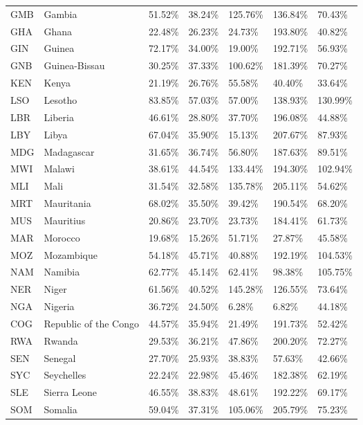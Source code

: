 \begin{table}[htbp]
\begin{tabular}{lllllll}
  GMB & Gambia & 51.52\% & 38.24\% & 125.76\% & 136.84\% & 70.43\% \\ 
  GHA & Ghana & 22.48\% & 26.23\% & 24.73\% & 193.80\% & 40.82\% \\ 
  GIN & Guinea & 72.17\% & 34.00\% & 19.00\% & 192.71\% & 56.93\% \\ 
  GNB & Guinea-Bissau & 30.25\% & 37.33\% & 100.62\% & 181.39\% & 70.27\% \\ 
  KEN & Kenya & 21.19\% & 26.76\% & 55.58\% & 40.40\% & 33.64\% \\ 
  LSO & Lesotho & 83.85\% & 57.03\% & 57.00\% & 138.93\% & 130.99\% \\ 
  LBR & Liberia & 46.61\% & 28.80\% & 37.70\% & 196.08\% & 44.88\% \\ 
  LBY & Libya & 67.04\% & 35.90\% & 15.13\% & 207.67\% & 87.93\% \\ 
  MDG & Madagascar & 31.65\% & 36.74\% & 56.80\% & 187.63\% & 89.51\% \\ 
  MWI & Malawi & 38.61\% & 44.54\% & 133.44\% & 194.30\% & 102.94\% \\ 
  MLI & Mali & 31.54\% & 32.58\% & 135.78\% & 205.11\% & 54.62\% \\ 
  MRT & Mauritania & 68.02\% & 35.50\% & 39.42\% & 190.54\% & 68.20\% \\ 
  MUS & Mauritius & 20.86\% & 23.70\% & 23.73\% & 184.41\% & 61.73\% \\ 
  MAR & Morocco & 19.68\% & 15.26\% & 51.71\% & 27.87\% & 45.58\% \\ 
  MOZ & Mozambique & 54.18\% & 45.71\% & 40.88\% & 192.19\% & 104.53\% \\ 
  NAM & Namibia & 62.77\% & 45.14\% & 62.41\% & 98.38\% & 105.75\% \\ 
  NER & Niger & 61.56\% & 40.52\% & 145.28\% & 126.55\% & 73.64\% \\ 
  NGA & Nigeria & 36.72\% & 24.50\% & 6.28\% & 6.82\% & 44.18\% \\ 
  COG & Republic of the Congo & 44.57\% & 35.94\% & 21.49\% & 191.73\% & 52.42\% \\ 
  RWA & Rwanda & 29.53\% & 36.21\% & 47.86\% & 200.20\% & 72.27\% \\ 
  SEN & Senegal & 27.70\% & 25.93\% & 38.83\% & 57.63\% & 42.66\% \\ 
  SYC & Seychelles & 22.24\% & 22.98\% & 45.46\% & 182.38\% & 62.19\% \\ 
  SLE & Sierra Leone & 46.55\% & 38.83\% & 48.61\% & 192.22\% & 69.17\% \\ 
  SOM & Somalia & 59.04\% & 37.31\% & 105.06\% & 205.79\% & 75.23\% \\ 

\end{tabular}
\end{table}
